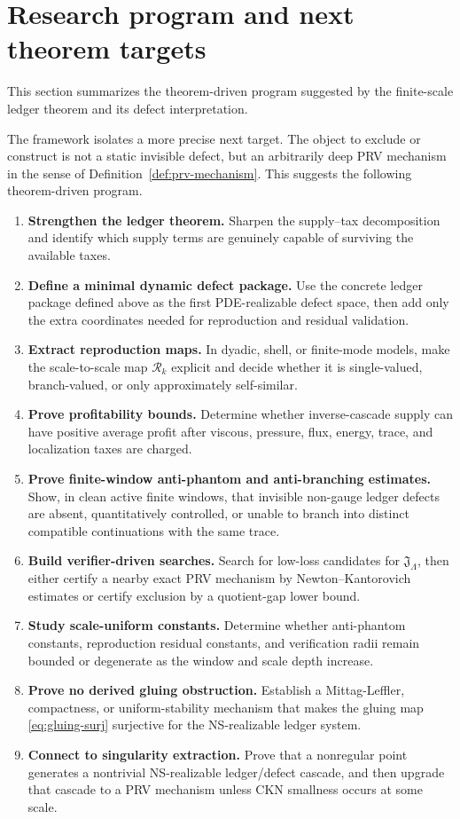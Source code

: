 \documentclass[11pt]{article}
\numberwithin{equation}{section}
\newcommand{\calR}{\mathcal R}
\begin{document}
\section{Research program and next theorem targets}\label{sec:research-program}
\noindent This section summarizes the theorem-driven program suggested by the finite-scale ledger theorem and its defect interpretation.

The framework isolates a more precise next target.  The object to exclude
or construct is not a static invisible defect, but an arbitrarily deep PRV
mechanism in the sense of Definition~\ref{def:prv-mechanism}.  This suggests
the following theorem-driven program.

\begin{enumerate}[label=\textbf{Step \arabic*:},leftmargin=3.2em]
    \item \textbf{Strengthen the ledger theorem.}  Sharpen the supply--tax decomposition and identify which supply terms are genuinely capable of surviving the available taxes.
    \item \textbf{Define a minimal dynamic defect package.}  Use the concrete ledger package defined above as the first PDE-realizable defect space, then add only the extra coordinates needed for reproduction and residual validation.
    \item \textbf{Extract reproduction maps.}  In dyadic, shell, or finite-mode models, make the scale-to-scale map \(\calR_k\) explicit and decide whether it is single-valued, branch-valued, or only approximately self-similar.
    \item \textbf{Prove profitability bounds.}  Determine whether inverse-cascade supply can have positive average profit after viscous, pressure, flux, energy, trace, and localization taxes are charged.
    \item \textbf{Prove finite-window anti-phantom and anti-branching estimates.}  Show, in clean active finite windows, that invisible non-gauge ledger defects are absent, quantitatively controlled, or unable to branch into distinct compatible continuations with the same trace.
    \item \textbf{Build verifier-driven searches.}  Search for low-loss candidates for \(\mathfrak J_\Lambda\), then either certify a nearby exact PRV mechanism by Newton--Kantorovich estimates or certify exclusion by a quotient-gap lower bound.
    \item \textbf{Study scale-uniform constants.}  Determine whether anti-phantom constants, reproduction residual constants, and verification radii remain bounded or degenerate as the window and scale depth increase.
    \item \textbf{Prove no derived gluing obstruction.}  Establish a Mittag-Leffler, compactness, or uniform-stability mechanism that makes the gluing map \eqref{eq:gluing-surj} surjective for the NS-realizable ledger system.
    \item \textbf{Connect to singularity extraction.}  Prove that a nonregular point generates a nontrivial NS-realizable ledger/defect cascade, and then upgrade that cascade to a PRV mechanism unless CKN smallness occurs at some scale.
\end{enumerate}
\end{document}
